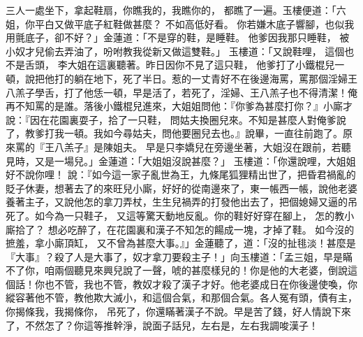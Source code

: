 \begin{showcontents}{}
三人一處坐下，拿起鞋扇，你瞧我的，我瞧你的，
都瞧了一遍。玉樓便道：「六姐，你平白又做平底子紅鞋做甚麼？
不如高低好看。
你若嫌木底子響腳，也似我用氈底子，卻不好？」金蓮道：「不是穿的鞋，是睡鞋。
他爹因我那只睡鞋，
被小奴才兒偷去弄油了，吩咐教我從新又做這雙鞋。」
玉樓道：「又說鞋哩，
這個也不是舌頭，
李大姐在這裏聽著。昨日因你不見了這只鞋，
他爹打了小鐵棍兒一頓，說把他打的躺在地下，死了半日。惹的一丈青好不在後邊海罵，罵那個淫婦王八羔子學舌，打了他恁一頓，早是活了，若死了，淫婦、王八羔子也不得清潔！俺再不知罵的是誰。落後小鐵棍兒進來，大姐姐問他：『你爹為甚麼打你？』小廝才說：『因在花園裏耍子，拾了一只鞋，
問姑夫換圈兒來。不知是甚麼人對俺爹說了，教爹打我一頓。我如今尋姑夫，問他要圈兒去也。』說畢，一直往前跑了。原來罵的『王八羔子』是陳姐夫。
早是只李嬌兒在旁邊坐著，大姐沒在跟前，若聽見時，又是一場兒。」金蓮道：「大姐姐沒說甚麼？」
玉樓道：「你還說哩，大姐姐好不說你哩！
說：『如今這一家子亂世為王，九條尾狐狸精出世了，把昏君禍亂的貶子休妻，想著去了的來旺兒小廝，好好的從南邊來了，東一帳西一帳，說他老婆養著主子，又說他怎的拿刀弄杖，生生兒禍弄的打發他出去了，把個媳婦又逼的吊死了。如今為一只鞋子，
又這等驚天動地反亂。你的鞋好好穿在腳上，
怎的教小廝拾了？
想必吃醉了，在花園裏和漢子不知怎的餳成一塊，才掉了鞋。
如今沒的摭羞，拿小廝頂缸，
又不曾為甚麼大事。』」金蓮聽了，道：「沒的扯毴淡！甚麼是『大事』？殺了人是大事了，奴才拿刀要殺主子！」向玉樓道：「孟三姐，早是瞞不了你，咱兩個聽見來興兒說了一聲，唬的甚麼樣兒的！你是他的大老婆，倒說這個話！你也不管，我也不管，教奴才殺了漢子才好。他老婆成日在你後邊使喚，你縱容著他不管，教他欺大滅小，和這個合氣，和那個合氣。各人冤有頭，債有主，你揭條我，我揭條你，
吊死了，你還瞞著漢子不說。早是苦了錢，好人情說下來了，不然怎了？你這等推幹淨，說面子話兒，左右是，左右我調唆漢子！

\end{showcontents}
